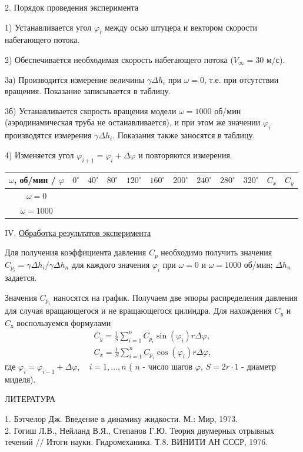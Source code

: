 \documentclass[specialist, subf, href, colorlinks=true, 14pt, final]{disser}
\theoremstyle{definition}
\newcommand{\npart}[2]{\noindent #1. \underline{#2}}
\begin{document}
\par 2. Порядок проведения эксперимента

\par 1) Устанавливается угол $\varphi_i$ между осью штуцера и вектором скорости набегающего потока.
\par 2) Обеспечивается необходимая скорость набегающего потока ($V_{\infty} = 30$ м/с).
\par 3а) Производится измерение величины $\gamma \Delta h_i$ при $\omega = 0$, т.е. при отсутствии вращения. Показание записывается в таблицу.
\par 3б) Устанавливается скорость вращения модели $\omega = 1000$ об/мин (аэродинамическая труба не останавливается), и при этом же значении $\varphi_i$ производятся измерения $\gamma \Delta h_i$. Показания также заносятся в таблицу.
\par 4) Изменяется угол $\varphi_{i+1} = \varphi_{i} + \Delta \varphi$ и повторяются измерения.

\begin{center}
    \begin{tabular}{|c|c|c|c|c|c|c|c|c|c|c|c|}
       \hline
        $\omega$, об/мин / $\varphi$ & $0 ^{\circ} $ & $40 ^{\circ} $ & $80 ^{\circ} $ & $120 ^{\circ} $ & $160 ^{\circ} $ & $200 ^{\circ} $ & $240 ^{\circ} $& $280 ^{\circ} $ & $320 ^{\circ} $& $C_x $ & $C_y $  \\ \hline
        $\omega = 0$&&&&&&&&&&&\\ \hline
        $\omega = 1000$ &&&&&&&&&&&\\ 
       \hline
    \end{tabular} 
\end{center}

\newpage
\npart{IV}{Обработка результатов эксперимента}

Для получения коэффициента давления $C_p$ необходимо получить значения $C_{p_i} = \gamma \Delta h_i / \gamma \Delta h_n $ для каждого значения $\varphi_i$ при $\omega = 0$ и $\omega = 1000$ об/мин; $\Delta h_n$ задается.

Значения $C_{p_i}$ наносятся на график. Получаем две эпюры распределения давления для случая вращающегося и не вращающегося цилиндра. Для нахождения $C_{y}$ и $C_{х}$ воспользуемся формулами
\[
\begin{array}{l}
  C_y = \frac{1}{S} \sum \limits^n_{i = 1} C_{p_i} \sin(\varphi_i) r \Delta \varphi,\\
  C_x = \frac{1}{S} \sum \limits^n_{i = 1} C_{p_i} \cos(\varphi_i) r \Delta \varphi,
\end{array}
\]
где $\varphi_i = \varphi_{i-1} + \Delta \varphi, \quad i = 1,...,n $ ( $n$ - число шагов $\varphi$, $S = 2 r \cdot 1$ - диаметр миделя).\\

\begin{center}
ЛИТЕРАТУРА
\end{center}
1. Бэтчелор Дж. Введение в динамику жидкости. М.: Мир, 1973.\\
2. Гогиш Л.В., Нейланд В.Я., Степанов Г.Ю. Теория двумерных отрывных течений // Итоги науки. Гидромеханика. Т.8. ВИНИТИ АН СССР, 1976.
\end{document}
